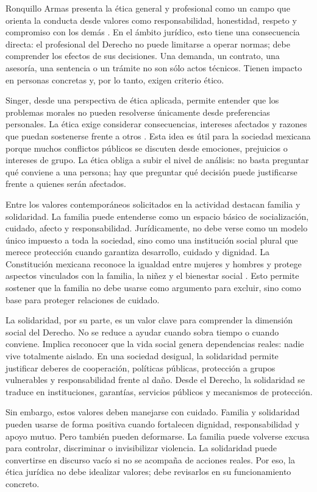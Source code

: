 \documentclass[
	spanish,
	letterpaper, oneside
]{article}
\begin{document}
Ronquillo Armas presenta la ética general y profesional como un campo que orienta la conducta desde valores como responsabilidad, honestidad, respeto y compromiso con los demás \citep{ronquilloarmasEticaGeneralProfesional2018}. En el ámbito jurídico, esto tiene una consecuencia directa: el profesional del Derecho no puede limitarse a operar normas; debe comprender los efectos de sus decisiones. Una demanda, un contrato, una asesoría, una sentencia o un trámite no son sólo actos técnicos. Tienen impacto en personas concretas y, por lo tanto, exigen criterio ético.

Singer, desde una perspectiva de ética aplicada, permite entender que los problemas morales no pueden resolverse únicamente desde preferencias personales. La ética exige considerar consecuencias, intereses afectados y razones que puedan sostenerse frente a otros \citep{singerCompendioEtica1995}. Esta idea es útil para la sociedad mexicana porque muchos conflictos públicos se discuten desde emociones, prejuicios o intereses de grupo. La ética obliga a subir el nivel de análisis: no basta preguntar qué conviene a una persona; hay que preguntar qué decisión puede justificarse frente a quienes serán afectados.

Entre los valores contemporáneos solicitados en la actividad destacan familia y solidaridad. La familia puede entenderse como un espacio básico de socialización, cuidado, afecto y responsabilidad. Jurídicamente, no debe verse como un modelo único impuesto a toda la sociedad, sino como una institución social plural que merece protección cuando garantiza desarrollo, cuidado y dignidad. La Constitución mexicana reconoce la igualdad entre mujeres y hombres y protege aspectos vinculados con la familia, la niñez y el bienestar social \citep{constitucionCPEUM2026}. Esto permite sostener que la familia no debe usarse como argumento para excluir, sino como base para proteger relaciones de cuidado.

La solidaridad, por su parte, es un valor clave para comprender la dimensión social del Derecho. No se reduce a ayudar cuando sobra tiempo o cuando conviene. Implica reconocer que la vida social genera dependencias reales: nadie vive totalmente aislado. En una sociedad desigual, la solidaridad permite justificar deberes de cooperación, políticas públicas, protección a grupos vulnerables y responsabilidad frente al daño. Desde el Derecho, la solidaridad se traduce en instituciones, garantías, servicios públicos y mecanismos de protección.

Sin embargo, estos valores deben manejarse con cuidado. Familia y solidaridad pueden usarse de forma positiva cuando fortalecen dignidad, responsabilidad y apoyo mutuo. Pero también pueden deformarse. La familia puede volverse excusa para controlar, discriminar o invisibilizar violencia. La solidaridad puede convertirse en discurso vacío si no se acompaña de acciones reales. Por eso, la ética jurídica no debe idealizar valores; debe revisarlos en su funcionamiento concreto.
\end{document}
